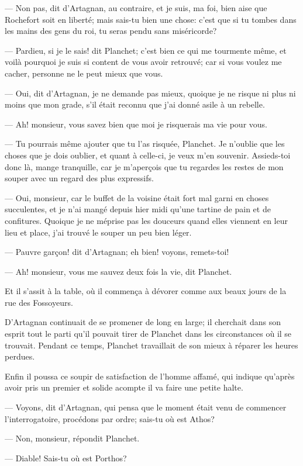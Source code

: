 — Non pas, dit d'Artagnan, au contraire, et je suis, ma foi, bien aise que Rochefort soit en liberté; mais sais-tu bien une chose: c'est que si tu tombes dans les mains des gens du roi, tu seras pendu sans miséricorde?

— Pardieu, si je le sais! dit Planchet; c'est bien ce qui me tourmente même, et voilà pourquoi je suis si content de vous avoir retrouvé; car si vous voulez me cacher, personne ne le peut mieux que vous.

— Oui, dit d'Artagnan, je ne demande pas mieux, quoique je ne risque ni plus ni moins que mon grade, s'il était reconnu que j'ai donné asile à un rebelle.

— Ah! monsieur, vous savez bien que moi je risquerais ma vie pour vous.

— Tu pourrais même ajouter que tu l'as risquée, Planchet. Je n'oublie que les choses que je dois oublier, et quant à celle-ci, je veux m'en souvenir. Assieds-toi donc là, mange tranquille, car je m'aperçois que tu regardes les restes de mon souper avec un regard des plus expressifs.

— Oui, monsieur, car le buffet de la voisine était fort mal garni en choses succulentes, et je n'ai mangé depuis hier midi qu'une tartine de pain et de confitures. Quoique je ne méprise pas les douceurs quand elles viennent en leur lieu et place, j'ai trouvé le souper un peu bien léger.

— Pauvre garçon! dit d'Artagnan; eh bien! voyons, remets-toi!

— Ah! monsieur, vous me sauvez deux fois la vie, dit Planchet.

Et il s'assit à la table, où il commença à dévorer comme aux beaux jours de la rue des Fossoyeurs.

D'Artagnan continuait de se promener de long en large; il cherchait dans son esprit tout le parti qu'il pouvait tirer de Planchet dans les circonstances où il se trouvait. Pendant ce temps, Planchet travaillait de son mieux à réparer les heures perdues.

Enfin il poussa ce soupir de satisfaction de l'homme affamé, qui indique qu'après avoir pris un premier et solide acompte il va faire une petite halte.

— Voyons, dit d'Artagnan, qui pensa que le moment était venu de commencer l'interrogatoire, procédons par ordre; sais-tu où est Athos?

— Non, monsieur, répondit Planchet.

— Diable! Sais-tu où est Porthos?

